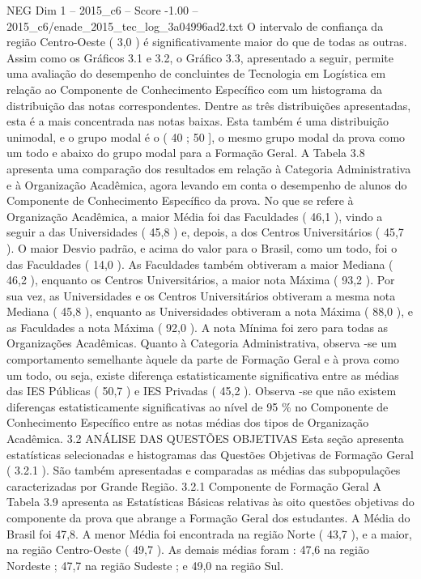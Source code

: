 \begin{textsample}{NEG Dim 1 – 2015\_c6 – Score -1.00 – 2015\_c6/enade\_2015\_tec\_log\_3a04996ad2.txt}
O intervalo de confiança da região Centro-Oeste ( 3,0 ) é significativamente maior do que de todas as outras.
Assim como os Gráficos 3.1 e 3.2, o Gráfico 3.3, apresentado a seguir, permite uma avaliação do desempenho de concluintes de Tecnologia em Logística em relação ao Componente de Conhecimento Específico com um histograma da distribuição das notas correspondentes.
Dentre as três distribuições apresentadas, esta é a mais concentrada nas notas baixas.
Esta também é uma distribuição unimodal, e o grupo modal é o ( 40 ; 50 ], o mesmo grupo modal da prova como um todo e abaixo do grupo modal para a Formação Geral.
A Tabela 3.8 apresenta uma comparação dos resultados em relação à Categoria Administrativa e à Organização Acadêmica, agora levando em conta o desempenho de alunos do Componente de Conhecimento Específico da prova.
No que se refere à Organização Acadêmica, a maior Média foi das Faculdades ( 46,1 ), vindo a seguir a das Universidades ( 45,8 ) e, depois, a dos Centros Universitários ( 45,7 ).
O maior Desvio padrão, e acima do valor para o Brasil, como um todo, foi o das Faculdades ( 14,0 ).
As Faculdades também obtiveram a maior Mediana ( 46,2 ), enquanto os Centros Universitários, a maior nota Máxima ( 93,2 ).
Por sua vez, as Universidades e os Centros Universitários obtiveram a mesma nota Mediana ( 45,8 ), enquanto as Universidades obtiveram a nota Máxima ( 88,0 ), e as Faculdades a nota Máxima ( 92,0 ).
A nota Mínima foi zero para todas as Organizações Acadêmicas.
Quanto à Categoria Administrativa, observa -se um comportamento semelhante àquele da parte de Formação Geral e à prova como um todo, ou seja, existe diferença estatisticamente significativa entre as médias das IES Públicas ( 50,7 ) e IES Privadas ( 45,2 ).
Observa -se que não existem diferenças estatisticamente significativas ao nível de 95 \% no Componente de Conhecimento Específico entre as notas médias dos tipos de Organização Acadêmica. 3.2 ANÁLISE DAS QUESTÕES OBJETIVAS Esta seção apresenta estatísticas selecionadas e histogramas das Questões Objetivas de Formação Geral ( 3.2.1 ).
São também apresentadas e comparadas as médias das subpopulações caracterizadas por Grande Região. 3.2.1 Componente de Formação Geral A Tabela 3.9 apresenta as Estatísticas Básicas relativas às oito questões objetivas do componente da prova que abrange a Formação Geral dos estudantes.
A Média do Brasil foi 47,8.
A menor Média foi encontrada na região Norte ( 43,7 ), e a maior, na região Centro-Oeste ( 49,7 ).
As demais médias foram : 47,6 na região Nordeste ; 47,7 na região Sudeste ; e 49,0 na região Sul.

\end{textsample}
